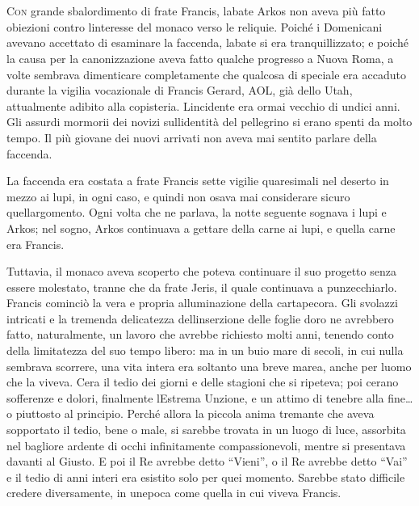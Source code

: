 	\chapter{\phantom{title}}

\lettrine{C}{on} grande sbalordimento di frate Francis, l\textquotesingle abate Arkos
non aveva più fatto obiezioni contro l\textquotesingle interesse del
monaco verso le reliquie. Poiché i Domenicani avevano accettato di
esaminare la faccenda, l\textquotesingle abate si era tranquillizzato; e
poiché la causa per la canonizzazione aveva fatto qualche progresso a
Nuova Roma, a volte sembrava dimenticare completamente che qualcosa di
speciale era accaduto durante la vigilia vocazionale di Francis Gerard,
AOL, già dello Utah, attualmente adibito alla copisteria.
L\textquotesingle incidente era ormai vecchio di undici anni. Gli
assurdi mormorii dei novizi sull\textquotesingle identità del pellegrino
si erano spenti da molto tempo. Il più giovane dei nuovi arrivati non
aveva mai sentito parlare della faccenda.

La faccenda era costata a frate Francis sette vigilie quaresimali nel
deserto in mezzo ai lupi, in ogni caso, e quindi non osava mai
considerare sicuro quell\textquotesingle argomento. Ogni volta che ne
parlava, la notte seguente sognava i lupi e Arkos; nel sogno, Arkos
continuava a gettare della carne ai lupi, e quella carne era Francis.

Tuttavia, il monaco aveva scoperto che poteva continuare il suo progetto
senza essere molestato, tranne che da frate Jeris, il quale continuava a
punzecchiarlo. Francis cominciò la vera e propria alluminazione della
cartapecora. Gli svolazzi intricati e la tremenda delicatezza
dell\textquotesingle inserzione delle foglie d\textquotesingle oro ne
avrebbero fatto, naturalmente, un lavoro che avrebbe richiesto molti
anni, tenendo conto della limitatezza del suo tempo libero: ma in un
buio mare di secoli, in cui nulla sembrava scorrere, una vita intera era
soltanto una breve marea, anche per l\textquotesingle uomo che la
viveva. C\textquotesingle era il tedio dei giorni e delle stagioni che
si ripeteva; poi c\textquotesingle erano sofferenze e dolori, finalmente
l\textquotesingle Estrema Unzione, e un attimo di tenebre alla
fine\ldots{} o piuttosto al principio. Perché allora la piccola anima
tremante che aveva sopportato il tedio, bene o male, si sarebbe trovata
in un luogo di luce, assorbita nel bagliore ardente di occhi
infinitamente compassionevoli, mentre si presentava davanti al Giusto. E
poi il Re avrebbe detto ``Vieni'', o il Re avrebbe detto ``Vai'' e il
tedio di anni interi era esistito solo per quei momento. Sarebbe stato
difficile credere diversamente, in un\textquotesingle epoca come quella
in cui viveva Francis.

